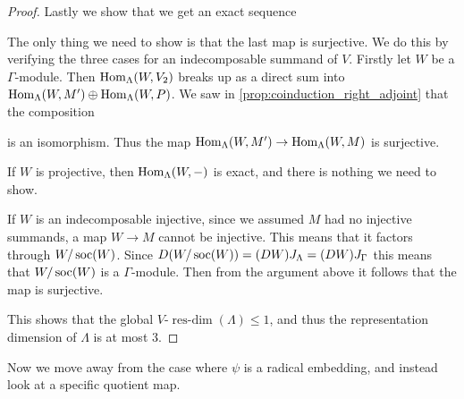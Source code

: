 \begin{theorem}
\begin{proof}
		Lastly we show that we get an exact sequence
		\begin{center}
		\end{center} 
		The only thing we need to show is that the last map is surjective. We do this by verifying the three cases for an indecomposable summand of $V$. Firstly let $W$ be a $\Gamma$-module. Then $\operatorname{Hom}_\Lambda(W, V_2)$ breaks up as a direct sum into $\operatorname{Hom}_\Lambda(W, M') \oplus \operatorname{Hom}_\Lambda(W, P)$. We saw in \cref{prop:coinduction_right_adjoint} that the composition
		is an isomorphism. Thus the map $\operatorname{Hom}_\Lambda(W, M') \to \operatorname{Hom}_\Lambda(W, M)$ is surjective.
		
		If $W$ is projective, then $\operatorname{Hom}_\Lambda(W, -)$ is exact, and there is nothing we need to show.
		
		If $W$ is an indecomposable injective, since we assumed $M$ had no injective summands, a map $W \to M$ cannot be injective. This means that it factors through $W/\operatorname{soc}(W)$. Since $D(W/\operatorname{soc}(W)) = (DW)J_\Lambda = (DW)J_\Gamma$ this means that $W/\operatorname{soc}(W)$ is a $\Gamma$-module. Then from the argument above it follows that the map is surjective.
		
		This shows that the global $V$-$\operatorname{res-dim}(\Lambda) \leq 1$, and thus the representation dimension of $\Lambda$ is at most 3.
	\end{proof}
\end{theorem}

Now we move away from the case where $\psi$ is a radical embedding, and instead look at a specific quotient map.

